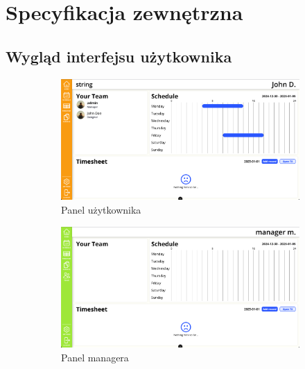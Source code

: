\chapter{Specyfikacja zewnętrzna}
\label{ch:04}

\section{Wygląd interfejsu użytkownika}


\begin{figure}[H]
    \centering
    \begin{subfigure}{0.40\textwidth}
        \includegraphics[width=\textwidth]{graf/userDashboard.png}
        \caption{Panel użytkownika}
        \label{fig:userDashboard}
    \end{subfigure}
    \begin{subfigure}{0.40\textwidth}
        \includegraphics[width=\textwidth]{graf/managerDashboard.png}
        \caption{Panel managera}
        \label{fig:managerDashboard}
    \end{subfigure}
    \begin{subfigure}{0.40\textwidth}

\end{subfigure}
\end{figure}
